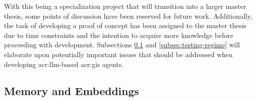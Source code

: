 With this being a specialization project that will transition into a larger master thesis, some points of discussion have been reserved for future work. Additionally, the task of developing a proof of concept has been assigned to the master thesis due to time constraints and the intention to acquire more knowledge before proceeding with development. Subsections \ref{subsec:memory-and-embeddings} and \ref{subsec:testing-regime} will elaborate upon potentially important issues that should be addressed when developing \acrshort{acr:llm}-based \acrshort{acr:gis} agents.




\subsection{Memory and Embeddings}\label{subsec:memory-and-embeddings}

